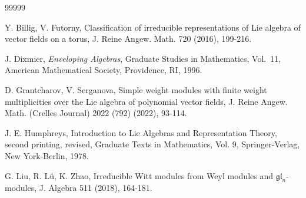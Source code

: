 \documentclass[12pt,a4paper]{amsart}
\def\gl{gl}%
\numberwithin{equation}{section}
\newcommand{\C}{\mathbb C}
\def\sl{\mathfrak{sl}}
\def\gl{\mathfrak{gl}}
\begin{document}
\begin{thebibliography}{99999}



Y. Billig, V. Futorny, Classification of irreducible representations of Lie algebra of vector fields on a torus, J. Reine Angew. Math. 720 (2016), 199-216.




J. Dixmier, \emph{Enveloping Algebras}, Graduate Studies in
Mathematics, Vol.~11, American Mathematical Society, Providence, RI,
1996.



D. Grantcharov, V. Serganova, Simple weight modules with finite weight multiplicities over the Lie algebra of polynomial vector fields, J. Reine Angew. Math. (Crelles Journal) 2022 (792) (2022), 93-114.


 J. E. Humphreys, Introduction to Lie Algebras and Representation Theory, second printing, revised, Graduate Texts in Mathematics, Vol. 9, Springer-Verlag, New York-Berlin, 1978.





G. Liu, R. L\"{u}, K. Zhao, Irreducible Witt modules from Weyl modules and $\gl_n$-modules, J. Algebra 511 (2018), 164-181.


\end{thebibliography}
\end{document}
